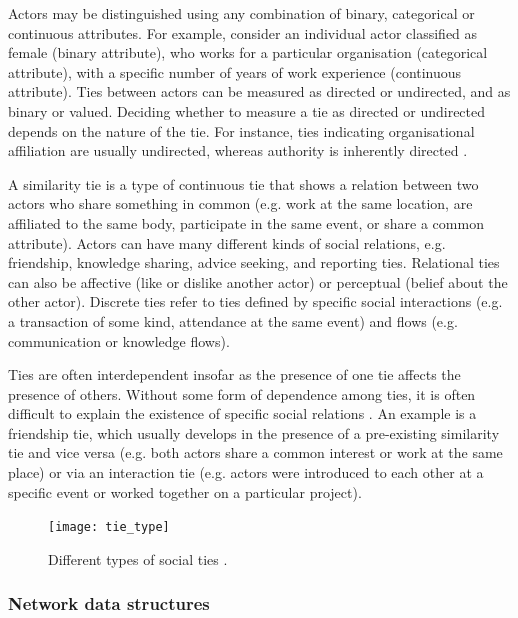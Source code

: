 Actors may be distinguished using any combination of binary, categorical or continuous attributes. For example, consider an individual actor classified as female (binary attribute), who works for a particular organisation (categorical attribute), with a specific number of years of work experience (continuous attribute). Ties between actors can be measured as directed or undirected, and as binary or valued. Deciding whether to measure a tie as directed or undirected depends on the nature of the tie. For instance, ties indicating organisational affiliation are usually undirected, whereas authority is inherently directed \citep{borgatti2013analyzing}. \medskip
 
 A similarity tie is a type of continuous tie that shows a relation between two actors who share something in common (e.g. work at the same location, are affiliated to the same body, participate in the same event, or share a common attribute). Actors can have many different kinds of social relations, e.g. friendship, knowledge sharing, advice seeking, and reporting ties. Relational ties can also be affective (like or dislike another actor) or perceptual (belief about the other actor). Discrete ties refer to ties defined by specific social interactions (e.g. a transaction of some kind, attendance at the same event) and flows (e.g. communication or knowledge flows). \medskip

Ties are often interdependent insofar as the presence of one tie affects the presence of others. Without some form of dependence among ties, it is often difficult to explain the existence of specific social relations \citep{lusher2013exponential}. An example is a friendship tie, which usually develops in the presence of a pre-existing similarity tie and vice versa (e.g. both actors share a common interest or work at the same place) or via an interaction tie (e.g. actors were introduced to each other at a specific event or worked together on a particular project). \medskip

\begin{figure}[hbt!]
    \centering
    \texttt{[image: tie\_type]}
    \caption[Different types of social ties]{Different types of social ties \citep{borgatti2013analyzing}.}
    \label{fig:tie_type}
\end{figure}

\subsubsection{Network data structures}

